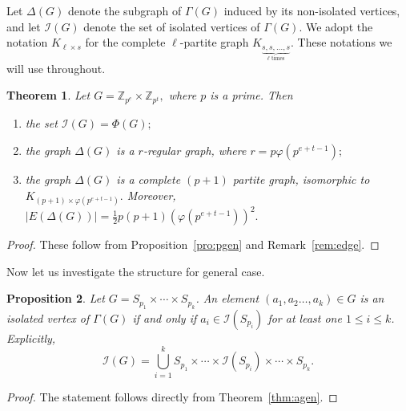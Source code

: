 \documentclass[11pt]{article}
\def \Z {{\mathbb Z}}
\def \I {{\mathcal I}}
\newtheorem{theorem}{Theorem}[section]
\newtheorem{pro}[theorem]{Proposition}
\begin{document}
Let $\Delta(G)$ denote the subgraph of $\Gamma(G)$ induced by its non-isolated vertices, and let $\mathcal{I}(G)$ 
denote the set of isolated vertices of $\Gamma(G)$. We adopt the notation $K_{\ell\times s}$ for the complete $\ell$-partite graph $K_{\underbrace{s,s,\ldots,s}_{\ell\text{ times}}}.$ These notations we will use throughout.

\begin{theorem}\label{thm:pgraph}
    Let $G=\Z_{p^e}\times  \Z_{p^t},$ where $p$ is a prime. Then 
    \begin{enumerate}[label=(\roman*)]
        \item the set $\mathcal{I}(G)=\Phi(G);$
        \item  the graph $\Delta(G)$ is a {$r$-regular} graph, where $r=p\varphi(p^{e+t-1});$ 
        \item the graph $\Delta(G)$ is a complete $(p+1)$ partite graph, isomorphic to $K_{(p+1)\times \varphi(p^{e+t-1})}.$ Moreover, $|E(\Delta(G))|=\frac{1}{2}p(p+1)(\varphi(p^{e+t-1}))^2.$
       \end{enumerate}
\end{theorem}
\begin{proof}
    These follow from Proposition~\ref{pro:pgen} and Remark~\ref{rem:edge}.
\end{proof}


Now let us investigate the structure for general case.
\begin{pro}\label{pro:iso1}
        Let $G = S_{p_1} \times \cdots \times S_{p_k}$. An element 
        $(a_1, a_2 \ldots, a_k) \in G$ is an isolated vertex of 
        $\Gamma(G)$ if and only if $a_i \in \mathcal{I}(S_{p_i})$ 
        for at least one $1 \leq i \leq k$. Explicitly,
        $$\I(G) = \bigcup_{i=1}^{k} S_{p_1} \times \cdots \times 
        \I(S_{p_i}) \times \cdots \times S_{p_k}.$$
\end{pro}
\begin{proof}
    The statement follows directly from Theorem~\ref{thm:agen}.
\end{proof}
\end{document}
